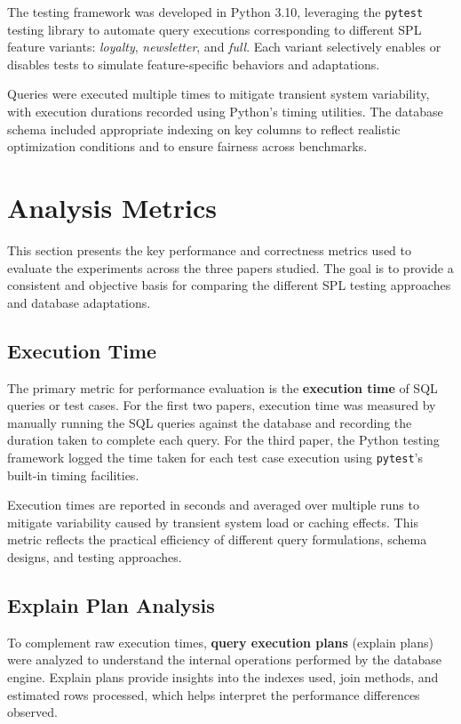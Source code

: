 The testing framework was developed in Python 3.10, leveraging the \texttt{pytest} testing library to automate query executions corresponding to different SPL feature variants: \textit{loyalty}, \textit{newsletter}, and \textit{full}. Each variant selectively enables or disables tests to simulate feature-specific behaviors and adaptations.

Queries were executed multiple times to mitigate transient system variability, with execution durations recorded using Python's timing utilities. The database schema included appropriate indexing on key columns to reflect realistic optimization conditions and to ensure fairness across benchmarks.

\section{Analysis Metrics}
\label{sec:ch4sec3}

This section presents the key performance and correctness metrics used to evaluate the experiments across the three papers studied. The goal is to provide a consistent and objective basis for comparing the different SPL testing approaches and database adaptations.

\subsection{Execution Time}

The primary metric for performance evaluation is the \textbf{execution time} of SQL queries or test cases. For the first two papers, execution time was measured by manually running the SQL queries against the database and recording the duration taken to complete each query. For the third paper, the Python testing framework logged the time taken for each test case execution using \texttt{pytest}'s built-in timing facilities.

Execution times are reported in seconds and averaged over multiple runs to mitigate variability caused by transient system load or caching effects. This metric reflects the practical efficiency of different query formulations, schema designs, and testing approaches.

\subsection{Explain Plan Analysis}

To complement raw execution times, \textbf{query execution plans} (explain plans) were analyzed to understand the internal operations performed by the database engine. Explain plans provide insights into the indexes used, join methods, and estimated rows processed, which helps interpret the performance differences observed.

